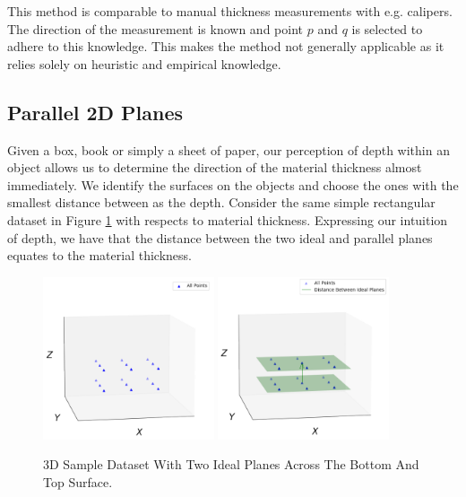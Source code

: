 \documentclass[%
]{USN-MSc}
\begin{document}
This method is comparable to manual thickness measurements with e.g. calipers. The direction of the measurement is known and point \(p\) and \(q\) is selected to adhere to this knowledge. This makes the method not generally  applicable as it relies solely on heuristic and empirical knowledge. 


\subsection{Parallel 2D Planes}
\label{sub:Parellel 2D Planes}
Given a box, book or simply a sheet of paper, our perception of depth within an object allows us to determine the direction of the material thickness almost immediately. We identify the surfaces on the objects and choose the ones with the smallest distance between as the depth.
Consider the same simple rectangular dataset in Figure \ref{fig:Sample Data-set} with respects to material thickness.
Expressing our intuition of depth, we have that the distance between the two ideal and parallel planes equates to the material thickness.

\begin{figure}[H]
  \centering
  \includegraphics[width=0.45\textwidth]{fig/Sample Data-set.png}
  \includegraphics[width=0.45\textwidth]{fig/Sample Data-Set Ideal Planes.png}
  \caption{3D Sample Dataset With Two Ideal Planes Across The Bottom And Top Surface.}
  \label{fig:Sample Data-set}
\end{figure}
\end{document}
